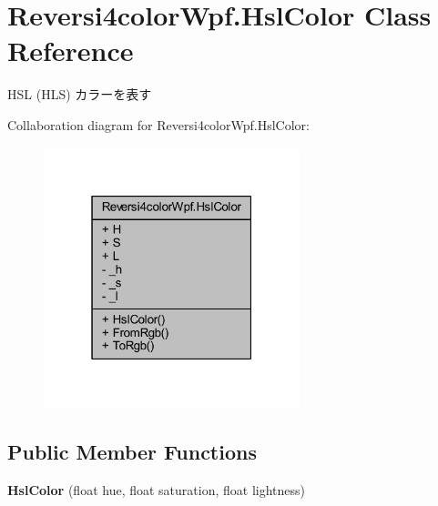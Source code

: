 \hypertarget{class_reversi4color_wpf_1_1_hsl_color}{}\section{Reversi4color\+Wpf.\+Hsl\+Color Class Reference}
\label{class_reversi4color_wpf_1_1_hsl_color}


H\+SL (H\+LS) カラーを表す  




Collaboration diagram for Reversi4color\+Wpf.\+Hsl\+Color\+:
\nopagebreak
\begin{figure}[H]
\begin{center}
\leavevmode
\includegraphics[width=211pt]{class_reversi4color_wpf_1_1_hsl_color__coll__graph}
\end{center}
\end{figure}
\subsection*{Public Member Functions}
\begin{DoxyCompactItemize}
\item 
{\bfseries Hsl\+Color} (float hue, float saturation, float lightness)\hypertarget{class_reversi4color_wpf_1_1_hsl_color_a2da983b84103f7499dceeb9487722df1}{}\label{class_reversi4color_wpf_1_1_hsl_color_a2da983b84103f7499dceeb9487722df1}

\end{DoxyCompactItemize}

